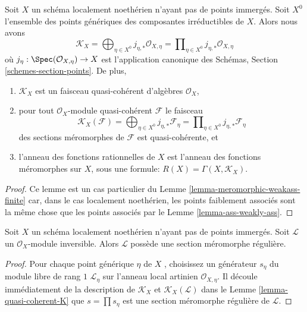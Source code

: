 \begin{lemma}
\label{lemma-quasi-coherent-K}
Soit  $X$  un schéma localement noethérien n'ayant pas de points immergés.
Soit  $X^0$  l'ensemble des points génériques des composantes irréductibles
de  $X$. Alors nous avons
$$
\mathcal{K}_X =
\bigoplus\nolimits_{\eta \in X^0} j_{\eta, *}\mathcal{O}_{X, \eta} =
\prod\nolimits_{\eta \in X^0} j_{\eta, *}\mathcal{O}_{X, \eta}
$$
où  $j_\eta : \Spec(\mathcal{O}_{X, \eta}) \to X$  est l'application canonique des Schémas, Section  \ref{schemes-section-points}. De
plus,
\begin{enumerate}
\item $\mathcal{K}_X$  est un faisceau quasi-cohérent d'algèbres  $\mathcal{O}_X$,
\item pour tout  $\mathcal{O}_X$-module quasi-cohérent  $\mathcal{F}$  le faisceau
$$
\mathcal{K}_X(\mathcal{F}) =
\bigoplus\nolimits_{\eta \in X^0} j_{\eta, *}\mathcal{F}_\eta =
\prod\nolimits_{\eta \in X^0} j_{\eta, *}\mathcal{F}_\eta
$$
des sections méromorphes de  $\mathcal{F}$  est quasi-cohérente, et
\item l'anneau des fonctions rationnelles de  $X$  est l'anneau des fonctions
méromorphes sur  $X$, sous une formule:  $R(X) = \Gamma(X, \mathcal{K}_X)$.
\end{enumerate}
\end{lemma}

\begin{proof}
Ce lemme est un cas particulier du Lemme  \ref{lemma-meromorphic-weakass-finite}  car, dans le cas localement
noethérien, les points faiblement associés sont la même chose que les points
associés par le Lemme  \ref{lemma-ass-weakly-ass}.
\end{proof}

\begin{lemma}
\label{lemma-regular-meromorphic-section-exists-noetherian}
Soit  $X$  un schéma localement noethérien n'ayant pas de points immergés.
Soit  $\mathcal{L}$  un  $\mathcal{O}_X$-module inversible. Alors  $\mathcal{L}$  possède
une section méromorphe régulière.
\end{lemma}

\begin{proof}
Pour chaque point générique  $\eta$  de  $X$ , choisissez un générateur
 $s_\eta$  du module libre de rang  $1$   $\mathcal{L}_\eta$  sur l'anneau local
artinien  $\mathcal{O}_{X, \eta}$. Il découle immédiatement de la description de  $\mathcal{K}_X$ 
et  $\mathcal{K}_X(\mathcal{L})$  dans le Lemme  \ref{lemma-quasi-coherent-K}  que  $s = \prod s_\eta$  est une section
méromorphe régulière de  $\mathcal{L}$.
\end{proof}


